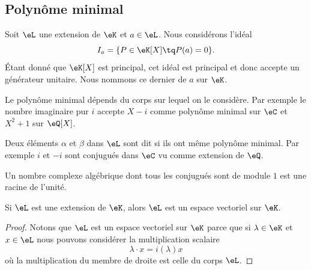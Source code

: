 \subsection{Polynôme minimal}

Soit \( \eL\) une extension de \( \eK\) et \( a\in \eL\). Nous considérons l'idéal
\begin{equation}
    I_a=\{ P\in \eK[X]\tq P(a)=0 \}.
\end{equation}
Étant donné que \( \eK[X]\) est principal, cet idéal est principal et donc accepte un générateur unitaire. Nous nommons ce dernier  de \( a\) sur \( \eK\).

\begin{example}
Le polynôme minimal dépends du corps sur lequel on le considère. Par exemple le nombre imaginaire pur \( i\) accepte \( X-i\) comme polynôme minimal sur \( \eC\) et \( X^2+1\) sur \( \eQ[X]\).
\end{example}

Deux éléments \( \alpha\) et \( \beta\) dans \( \eL\) sont dit  si ils ont même polynôme minimal. Par exemple \( i\) et \( -i\) sont conjugués dans \( \eC\) vu comme extension de \( \eQ\).

\begin{lemma}
    Un nombre complexe algébrique dont tous les conjugués sont de module \( 1\) est une racine de l'unité.
\end{lemma}

\begin{lemma}
    Si \( \eL\) est une extension de \( \eK\), alors \( \eL\) est un espace vectoriel sur \( \eK\).
\end{lemma}

\begin{proof}
    Notons que \( \eL\) est un espace vectoriel sur \( \eK\) parce que si \( \lambda\in \eK\) et \( x\in \eL\) nous pouvons considérer la multiplication scalaire
    \begin{equation}
        \lambda\cdot x=i(\lambda)x
    \end{equation}
    où la multiplication du membre de droite est celle du corps \( \eL\). 
\end{proof}


